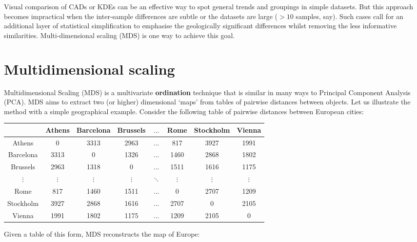 \begin{refsection}
Visual comparison of CADs or KDEs can be an effective way to spot
general trends and groupings in simple datasets. But this approach
becomes impractical when the inter-sample differences are subtle or
the datasets are large ($>10$ samples, say). Such cases call for an
additional layer of statistical simplification to emphasise the
geologically significant differences whilst removing the less
informative similarities. Multi-dimensional scaling (MDS) is one way
to achieve this goal.

\section{Multidimensional scaling}\label{sec:MDS}

Multidimensional Scaling (MDS) is a multivariate \textbf{ordination}
technique that is similar in many ways to Principal Component Analysis
(PCA). MDS aims to extract two (or higher) dimensional `maps' from
tables of pairwise distances between objects. Let us illustrate the
method with a simple geographical example. Consider the following
table of pairwise distances between European cities:

  \begin{tabular}{c|ccccccc}
  &  Athens & Barcelona & Brussels & $\ldots$ & Rome & Stockholm & Vienna \\ \hline
Athens & 0 & 3313 & 2963 & $\ldots$ & 817 & 3927 & 1991 \\
Barcelona & 3313 & 0 & 1326 & $\ldots$ & 1460 & 2868 & 1802 \\
Brussels & 2963 & 1318 & 0 & $\ldots$ & 1511 & 1616 & 1175 \\
$\vdots$ & $\vdots$ & $\vdots$ & $\vdots$ & $\ddots$ &
$\vdots$  & $\vdots$ & $\vdots$ \\
Rome & 817 & 1460 & 1511 & $\ldots$ & 0 & 2707 & 1209 \\
Stockholm & 3927 & 2868 & 1616 & $\ldots$ & 2707 & 0 & 2105 \\
Vienna & 1991 & 1802 & 1175 & $\ldots$ & 1209 & 2105 & 0 \\
  \end{tabular}
  \label{tab:eurodist}

Given a table of this form, MDS reconstructs the map of Europe:


\end{refsection}
